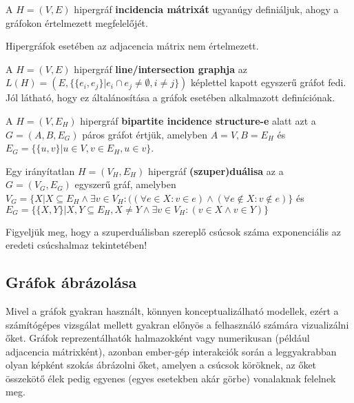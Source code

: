 \begin{definition}
A $H=(V,E)$ hipergráf \textbf{incidencia mátrixát} ugyanúgy definiáljuk, ahogy a gráfokon értelmezett megfelelőjét.
\end{definition}

\begin{note}
Hipergráfok esetében az adjacencia mátrix nem értelmezett.
\end{note}

\begin{definition}
A $H=(V,E)$ hipergráf \textbf{line/intersection graphja} az $L(H)=(E, \{ \{ e_i, e_j \} | e_i \cap e_j \neq \emptyset, i \neq j \})$ képlettel kapott egyszerű gráfot fedi. Jól látható, hogy ez általánosítása a gráfok esetében alkalmazott definíciónak.
\end{definition}

\begin{definition}
A $H=(V,E_H)$ hipergráf \textbf{bipartite incidence structure-e} alatt azt a $G=(A,B,E_G)$ páros gráfot értjük, amelyben $A=V, B=E_H$ és $E_G=\{\{u,v\} | u \in V, v \in E_H, u \in v \}$.
\end{definition}

\begin{definition}
Egy irányítatlan $H=(V_H,E_H)$ hipergráf \textbf{(szuper)duálisa} az a $G=(V_G,E_G)$ egyszerű gráf, amelyben $V_G=\{X | X \subseteq E_H \land \exists v \in V_H : ((\forall e \in X: v \in e) \land (\forall e \notin X : v \notin e) \}$ és $E_G=\{\{X,Y\} | X,Y \subseteq E_H, X \neq Y \land \exists v \in V_H : (v \in X \land v \in Y)\}$
\end{definition}

\begin{note}
Figyeljük meg, hogy a szuperduálisban szereplő csúcsok száma exponenciális az eredeti csúcshalmaz tekintetében!
\end{note}

\subsection{Gráfok ábrázolása} \label{graphLayout}

Mivel a gráfok gyakran használt, könnyen konceptualizálható modellek, ezért a számítógépes vizsgálat mellett gyakran előnyös a felhasználó számára vizualizálni őket. Gráfok reprezentálhatók halmazokként vagy numerikusan (például adjacencia mátrixként), azonban ember-gép interakciók során a leggyakrabban olyan képként szokás ábrázolni őket, amelyen a csúcsok köröknek, az őket összekötő élek pedig egyenes (egyes esetekben akár görbe) vonalaknak felelnek meg.


